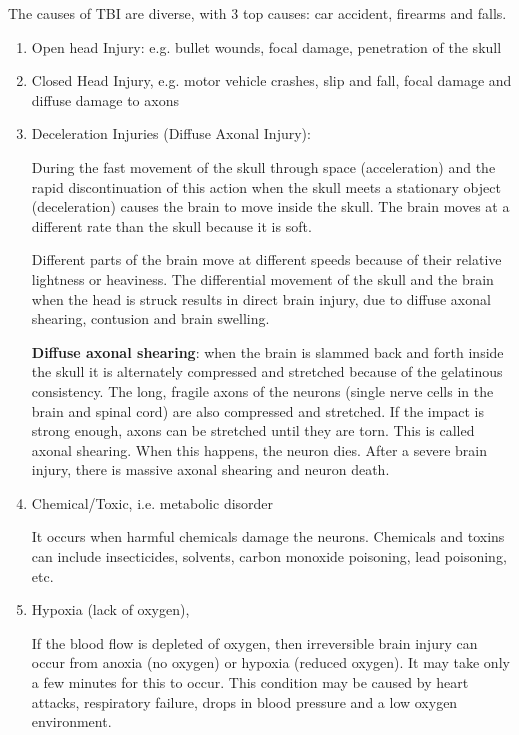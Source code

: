 The causes of TBI are diverse, with 3 top causes: car accident, firearms and
falls.
\begin{enumerate}
  \item  Open head Injury: e.g. bullet wounds, focal damage, penetration of the
  skull

  \item Closed Head Injury, e.g. motor vehicle crashes, slip and fall, focal
  damage and diffuse damage to axons

  \item Deceleration Injuries (Diffuse Axonal Injury):

During the fast movement of the skull through space (acceleration) and the rapid
discontinuation of this action when the skull meets a stationary object
(deceleration) causes the brain to move inside the skull.  The brain moves at a
different rate than the skull because it is soft.

Different parts of the brain move at different speeds because of their relative
lightness or heaviness. The differential movement of the skull and the brain
when the head is struck results in direct brain injury, due to diffuse axonal
shearing, contusion and brain swelling.

{\bf Diffuse axonal shearing}: when the brain is slammed back and forth inside
the skull it is alternately compressed and stretched because of the gelatinous
consistency.  The long, fragile axons of the  neurons (single nerve cells in the
brain and spinal cord) are also compressed and stretched.  If the impact is
strong enough, axons can be stretched until they are torn.  This is called
axonal shearing.  When this happens, the neuron dies.  After a severe brain
injury, there is massive axonal shearing and neuron death.


  \item Chemical/Toxic, i.e. metabolic disorder

It occurs when harmful chemicals damage the neurons. Chemicals and toxins can
include insecticides, solvents, carbon monoxide poisoning, lead poisoning, etc.


  \item Hypoxia (lack of oxygen),


If the blood flow is depleted of oxygen, then irreversible brain injury can
occur from anoxia (no oxygen) or hypoxia (reduced oxygen).
It may take only a few minutes for this to occur.
This condition may be caused by heart attacks, respiratory failure, drops in
blood pressure and a low oxygen environment.



\end{enumerate}
